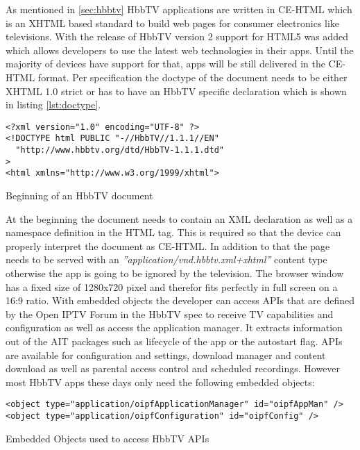 As mentioned in \ref{sec:hbbtv} HbbTV applications are written in CE-HTML which is an XHTML based standard to build web pages for consumer electronics like televisions. With the release of HbbTV version 2 support for HTML5 was added which allows developers to use the latest web technologies in their apps. Until the majority of devices have support for that, apps will be still delivered in the CE-HTML format. Per specification the doctype of the document needs to be either XHTML 1.0 strict or has to have an HbbTV specific declaration which is shown in listing \ref{lst:doctype}.

\vspace{0.5cm}
\begin{listing}[H]
\begin{verbatim}
<?xml version="1.0" encoding="UTF-8" ?>
<!DOCTYPE html PUBLIC "-//HbbTV//1.1.1//EN"
  "http://www.hbbtv.org/dtd/HbbTV-1.1.1.dtd"
>
<html xmlns="http://www.w3.org/1999/xhtml">
\end{verbatim}
\caption{Beginning of an HbbTV document}
\label{lst:doctype}
\end{listing}

At the beginning the document needs to contain an XML declaration as well as a namespace definition in the HTML tag. This is required so that the device can properly interpret the document as CE-HTML. In addition to that the page needs to be served with an \textit{''application/vnd.hbbtv.xml+xhtml''} content type otherwise the app is going to be ignored by the television. The browser window has a fixed size of 1280x720 pixel and therefor fits perfectly in full screen on a 16:9 ratio. With embedded objects the developer can access APIs that are defined by the Open IPTV Forum in the HbbTV spec to receive TV capabilities and configuration as well as access the application manager. It extracts information out of the AIT packages such as lifecycle of the app or the autostart flag. APIs are available for configuration and settings, download manager and content download as well as parental access control and scheduled recordings. However most HbbTV apps these days only need the following embedded objects:

\vspace{0.5cm}
\begin{listing}[H]
\begin{verbatim}
<object type="application/oipfApplicationManager" id="oipfAppMan" />
<object type="application/oipfConfiguration" id="oipfConfig" />
\end{verbatim}
\caption{Embedded Objects used to access HbbTV APIs}
\label{lst:embeddedObjects}
\end{listing}

